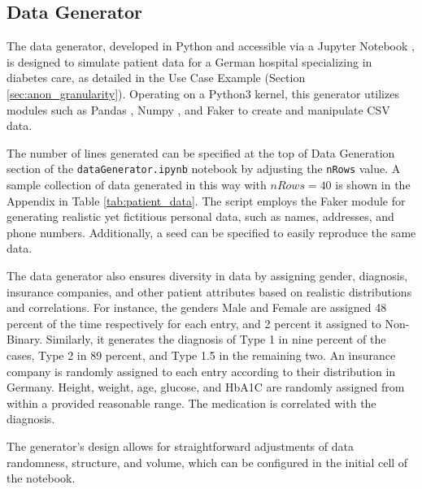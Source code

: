 \subsection{Data Generator\label{sec:data_gen}}
The data generator, developed in Python and accessible via a Jupyter Notebook \cite{jupyter_notebook}, is designed to simulate patient data for a German hospital specializing in diabetes care, as detailed in the Use Case Example (Section \ref{sec:anon_granularity}). Operating on a Python3 kernel, this generator utilizes modules such as Pandas \cite{pandas}, Numpy \cite{numpy}, and Faker \cite{faker} to create and manipulate CSV data. \par
The number of lines generated can be specified at the top of Data Generation section of the \texttt{dataGenerator.ipynb} notebook by adjusting the \texttt{nRows} value. A sample collection of data generated in this way with $nRows = 40$ is shown in the Appendix in Table \ref{tab:patient_data}. The script employs the Faker module for generating realistic yet fictitious personal data, such as names, addresses, and phone numbers. Additionally, a seed can be specified to easily reproduce the same data. \par
The data generator also ensures diversity in data by assigning gender, diagnosis, insurance companies, and other patient attributes based on realistic distributions and correlations. For instance, the genders Male and Female are assigned 48 percent of the time respectively for each entry, and 2 percent it assigned to Non-Binary. Similarly, it generates the diagnosis of Type 1 in nine percent of the cases, Type 2 in 89 percent, and Type 1.5 in the remaining two. An insurance company is randomly assigned to each entry according to their distribution in Germany. Height, weight, age, glucose, and HbA1C are randomly assigned from within a provided reasonable range. The medication is correlated with the diagnosis. \par
The generator's design allows for straightforward adjustments of data randomness, structure, and volume, which can be configured in the initial cell of the notebook.

